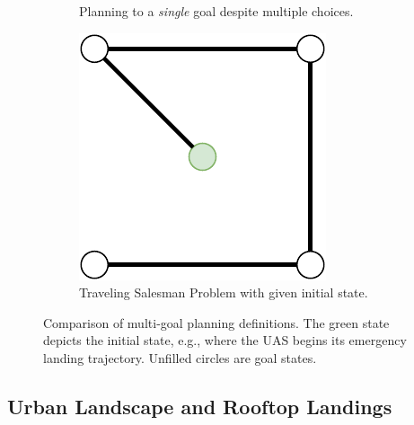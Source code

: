 \begin{figure}[ht!]
\begin{subfigure}[b]{0.30\linewidth}
    \caption{\label{fig:ch5_mg_sg_1} Planning to a \emph{single} goal despite multiple choices.}
  \end{subfigure}
  \hfill
  \begin{subfigure}[b]{0.30\linewidth}
    \centering\includegraphics[width=.85\linewidth]{chapter_5_mapping/imgs/mg_tsp_2.pdf}
    \caption{\label{fig:ch5_mg_tsp_2} Traveling Salesman Problem with given initial state. }
  \end{subfigure}
  \caption[Comparison of multi-goal planners]{Comparison of multi-goal planning definitions. The green state depicts the initial state, e.g., where the UAS begins its emergency landing trajectory.  Unfilled circles are goal states.}
  \label{fig:ch5_mg_example}
\end{figure}



\subsection{Urban Landscape and Rooftop Landings}

